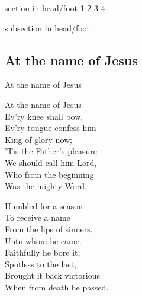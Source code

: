 \documentclass{beamer}
\begin{document}
{
{ 
 {
 \begin{beamercolorbox}[ht=4.5ex,dp=1.5ex,%
      leftskip=.3cm,rightskip=.3cm plus1fil]{section in head/foot}
 \fontsize{12}{25}\selectfont 
\hyperlink{At the name of Jesus[]1}{1}
\hyperlink{At the name of Jesus[]2}{2}
\hyperlink{At the name of Jesus[]3}{3}
\hyperlink{At the name of Jesus[]4}{4}
 
 \end{beamercolorbox}%
  \begin{beamercolorbox}[ht=2.5ex,dp=1.125ex,%
   leftskip=.3cm,rightskip=.3cm plus1fil]{subsection in head/foot}
   \insertauthor
 \end{beamercolorbox}%
 }
}
\subsection{ At the name of Jesus }

\hypertarget{At the name of Jesus[]1}{}
\begin{frame}{At the name of Jesus }
\fontsize{ 18 }{ 23 }\selectfont

At the name of Jesus\\ 
Ev'ry knee shall bow,\\ 
Ev'ry tongue confess him\\ 
King of glory now;\\ 
'Tis the Father's pleasure\\ 
We should call him Lord,\\ 
Who from the beginning\\ 
Was the mighty Word. 

\end{frame}

\hypertarget{At the name of Jesus[]2}{}
\begin{frame}{}
\fontsize{ 18 }{ 23 }\selectfont

Humbled for a season\\ 
To receive a name\\ 
From the lips of sinners,\\ 
Unto whom he came.\\ 
Faithfully he bore it,\\ 
Spotless to the last,\\ 
Brought it back victorious\\ 
When from death he passed. 

\end{frame}

}
\end{document}
